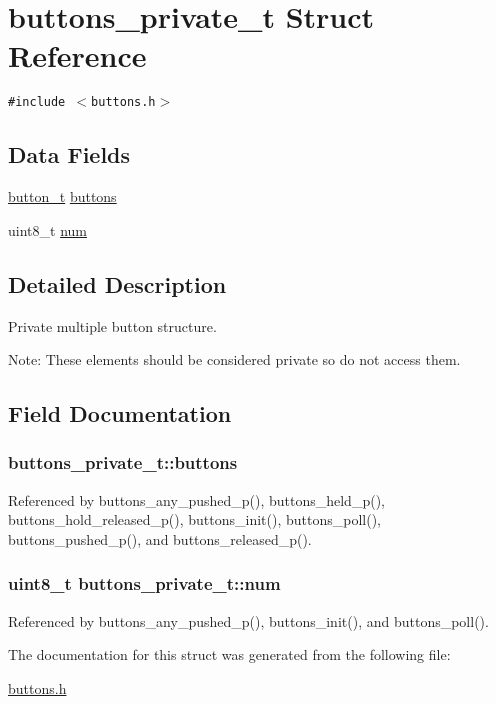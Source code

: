 \hypertarget{structbuttons__private__t}{
\section{buttons\_\-private\_\-t Struct Reference}
\label{structbuttons__private__t}
}
{\tt \#include $<$buttons.h$>$}

\subsection*{Data Fields}
\begin{CompactItemize}
\item 
\hyperlink{structbutton__private__t}{button\_\-t} \hyperlink{structbuttons__private__t_9fb996f4c45f5469bdf22af7b081e202}{buttons}
\item 
uint8\_\-t \hyperlink{structbuttons__private__t_f733697440bfea21ce6631a7cf2fa96c}{num}
\end{CompactItemize}


\subsection{Detailed Description}
Private multiple button structure.

\begin{Desc}
\item[Note:]These elements should be considered private so do not access them. \end{Desc}


\subsection{Field Documentation}
\hypertarget{structbuttons__private__t_9fb996f4c45f5469bdf22af7b081e202}{
\subsubsection{ {\bf buttons\_\-private\_\-t::buttons}}}
\label{structbuttons__private__t_9fb996f4c45f5469bdf22af7b081e202}




Referenced by buttons\_\-any\_\-pushed\_\-p(), buttons\_\-held\_\-p(), buttons\_\-hold\_\-released\_\-p(), buttons\_\-init(), buttons\_\-poll(), buttons\_\-pushed\_\-p(), and buttons\_\-released\_\-p().\hypertarget{structbuttons__private__t_f733697440bfea21ce6631a7cf2fa96c}{
\subsubsection{\setlength{\rightskip}{0pt plus 5cm}uint8\_\-t {\bf buttons\_\-private\_\-t::num}}}
\label{structbuttons__private__t_f733697440bfea21ce6631a7cf2fa96c}




Referenced by buttons\_\-any\_\-pushed\_\-p(), buttons\_\-init(), and buttons\_\-poll().

The documentation for this struct was generated from the following file:\begin{CompactItemize}
\item 
\hyperlink{buttons_8h}{buttons.h}\end{CompactItemize}
